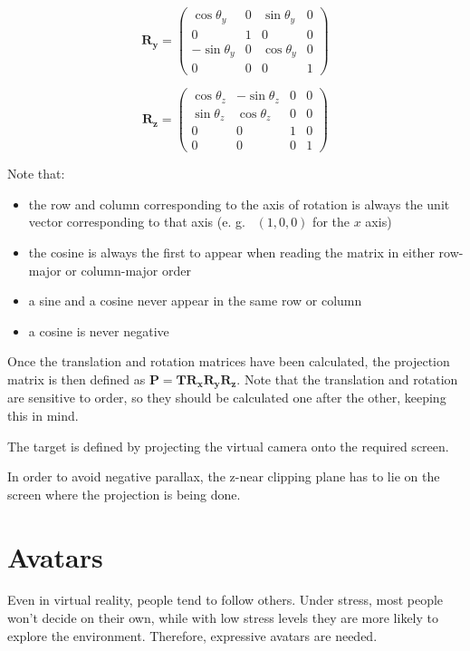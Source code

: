 \documentclass[a4paper]{article}
\begin{document}
\[
\mathbf{R_y} = \begin{pmatrix}
\cos \theta_y & 0 & \sin \theta_y & 0 \\
0 & 1 & 0 & 0 \\
-\sin \theta_y & 0 & \cos \theta_y & 0 \\
0 & 0 & 0 & 1
\end{pmatrix}
\]

\[
\mathbf{R_z} = \begin{pmatrix}
\cos \theta_z & -\sin \theta_z & 0 & 0 \\
\sin\theta_z & \cos \theta_z & 0 & 0 \\
0 & 0 & 1 & 0 \\
0 & 0 & 0 & 1
\end{pmatrix}
\]

Note that:

\begin{itemize}

\item
  the row and column corresponding to the axis of rotation is always the
  unit vector corresponding to that axis (e.
g.
~\((1, 0, 0)\) for the
  \(x\) axis)
\item
  the cosine is always the first to appear when reading the matrix in
  either row-major or column-major order
\item
  a sine and a cosine never appear in the same row or column
\item
  a cosine is never negative
\end{itemize}

Once the translation and rotation matrices have been calculated, the
projection matrix is then defined as
\(\mathbf{P} = \mathbf{T R_x R_y R_z}\).
Note that the translation and
rotation are sensitive to order, so they should be calculated one after
the other, keeping this in mind.

The target is defined by projecting the virtual camera onto the required
screen.

In order to avoid negative parallax, the z-near clipping plane has to
lie on the screen where the projection is being done.

\section{Avatars}

Even in virtual reality, people tend to follow others.
Under stress,
most people won't decide on their own, while with low stress levels they
are more likely to explore the environment.
Therefore, expressive
avatars are needed.
\end{document}
